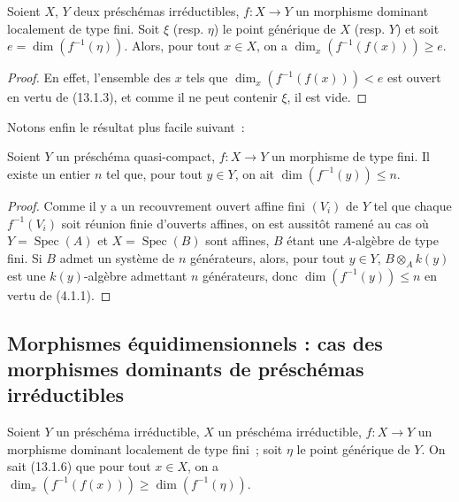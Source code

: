 \begin{corollary}[13.1.6]
\label{IV.13.1.6-fr}
Soient $X$, $Y$ deux préschémas irréductibles, $f:X\to Y$ un morphisme
dominant localement de type fini. Soit $\xi$ (resp. $\eta$) le point générique
de $X$ (resp. $Y$) et soit $e=\dim(f^{-1}(\eta))$. Alors, pour tout $x\in X$,
on a $\dim_x(f^{-1}(f(x)))\geq e$.
\end{corollary}

\begin{proof}
En effet, l'ensemble des $x$ tels que $\dim_x(f^{-1}(f(x)))<e$ est ouvert en
vertu de (13.1.3), et comme il ne peut contenir $\xi$, il est vide.
\end{proof}

Notons enfin le résultat plus facile suivant~:

\begin{proposition}[13.1.7]
\label{IV.13.1.7-fr}
Soient $Y$ un préschéma quasi-compact, $f:X\to Y$ un morphisme de type fini.
Il existe un entier $n$ tel que, pour tout $y\in Y$, on ait
$\dim(f^{-1}(y))\leq n$.
\end{proposition}

\begin{proof}
Comme il y a un recouvrement ouvert affine fini $(V_i)$ de $Y$ tel que chaque
$f^{-1}(V_i)$ soit réunion finie d'ouverts affines, on est aussitôt ramené au
cas où $Y=\operatorname{Spec}(A)$ et $X=\operatorname{Spec}(B)$ sont affines,
$B$ étant une $A$-algèbre de type fini. Si $B$ admet un système de $n$
générateurs, alors, pour tout $y\in Y$, $B\otimes_Ak(y)$ est une
$k(y)$-algèbre admettant $n$ générateurs, donc $\dim(f^{-1}(y))\leq n$ en
vertu de (4.1.1).
\end{proof}

\subsection{Morphismes équidimensionnels : cas des morphismes dominants de préschémas irréductibles}
\label{subsection:IV.13.2-fr}

\begin{env}[13.2.1]
\label{IV.13.2.1-fr}
Soient $Y$ un préschéma irréductible, $X$ un préschéma irréductible,
$f:X\to Y$ un morphisme dominant localement de type fini~; soit $\eta$ le
point générique de $Y$. On sait (13.1.6) que pour tout $x\in X$, on a
$\dim_x(f^{-1}(f(x)))\geq\dim(f^{-1}(\eta))$.
\end{env}

